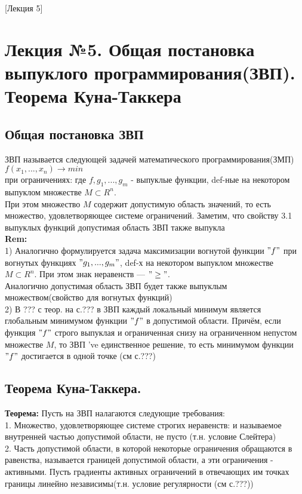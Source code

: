[Лекция 5]

\newpage

\section{Лекция №5. Общая постановка выпуклого программирования(ЗВП). Теорема Куна-Таккера}
\subsection{Общая постановка ЗВП}
ЗВП называется следующей задачей математического программирования(ЗМП)\\
$f(x_1,...,x_n) \rightarrow min$\\
при ограничениях:
где $f,g_1,...,g_m$ - выпуклые функции, def-ные на некотором выпуклом множестве $M\subset R^n$.\\
При этом множество $M$ содержит допустимую область значений, то есть множество, удовлетворяющее системе ограничений. Заметим, что свойству 3.1 выпуклых функций допустимая область ЗВП также выпукла \\
\textbf{Rem:}\\
1) Аналогично формулируется задача максимизации вогнутой функции $"f"$ при вогнутых функциях $"g_1,...,g_m"$, def-х на некотором выпуклом множестве $M\subset R^n$. При этом знак неравенств --- $"\geq"$.\\
Аналогично допустимая область ЗВП будет также выпуклым множеством(свойство для вогнутых функций)\\
2) В ??? с теор. на с.??? в ЗВП каждый локальный минимум является глобальным минимумом функции $"f"$ в допустимой области. Причём, если функция $"f"$ строго выпуклая и ограниченная снизу на ограниченном непустом множестве $M$, то ЗВП 've единственное решение, то есть минимумом функции $"f"$ достигается в одной точке
 (см с.???)

\subsection{Теорема Куна-Таккера.}
\textbf{Теорема:} Пусть на ЗВП налагаются следующие требования:\\
1. Множество, удовлетворяющее системе строгих неравенств:
и называемое внутренней частью допустимой области, не пусто (т.н. условие Слейтера) \\
2. Часть допустимой области, в которой некоторые ограничения обращаются в равенства, называется границей допустимой области, а эти ограничения - активными. Пусть градиенты активных ограничений в отвечающих им точках границы линейно независимы(т.н. условие регулярности (см с.???))\\

